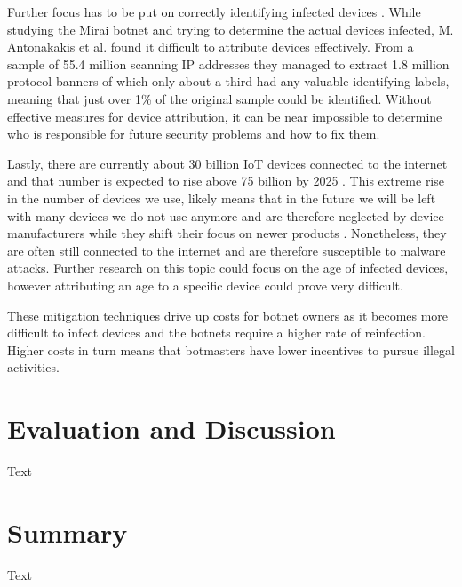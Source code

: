 Further focus has to be put on correctly identifying infected devices \cite{Antonakakis17}. While studying the Mirai botnet and trying to determine the actual devices infected, M. Antonakakis et al. \cite{Antonakakis17} found it difficult to attribute devices effectively. From a sample of 55.4 million scanning IP addresses they managed to extract 1.8 million protocol banners of which only about a third had any valuable identifying labels, meaning that just over 1\% of the original sample could be identified. Without effective measures for device attribution, it can be near impossible to determine who is responsible for future security problems and how to fix them.

Lastly, there are currently about 30 billion IoT devices connected to the internet and that number is expected to rise above 75 billion by 2025 \cite{Statista}. This extreme rise in the number of devices we use, likely means that in the future we will be left with many devices we do not use anymore and are therefore neglected by device manufacturers while they shift their focus on newer products \cite{Antonakakis17}. Nonetheless, they are often still connected to the internet and are therefore susceptible to malware attacks. Further research on this topic could focus on the age of infected devices, however attributing an age to a specific device could prove very difficult.

These mitigation techniques drive up costs for botnet owners as it becomes more difficult to infect devices and the botnets require a higher rate of reinfection. Higher costs in turn means that botmasters have lower incentives to pursue illegal activities.


\section{Evaluation and Discussion}
Text

\section{Summary}
Text

